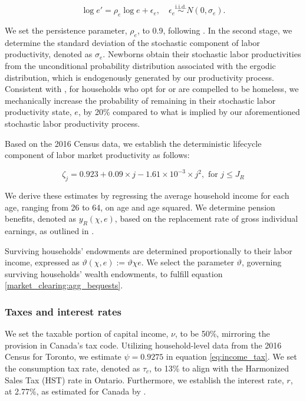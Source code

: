 \documentclass[parskip=full]{article}
\begin{document}
\begin{equation*}
  \log e' = \rho_{e} \log e + \epsilon_{e},\quad \epsilon_{e}\overset{\mathrm{i.i.d.}} \sim N(0,\sigma_{e}).
\end{equation*}

\noindent We set the persistence parameter, $\rho_{e}$, to 0.9, following \citet{gkkoc}. In the second stage, we determine the standard deviation of the stochastic component of labor productivity, denoted as $\sigma_{e}$. Newborns obtain their stochastic labor productivities from the unconditional probability distribution associated with the ergodic distribution, which is endogenously generated by our productivity process. Consistent with \citet{az-2024}, for households who opt for or are compelled to be homeless, we mechanically increase the probability of remaining in their stochastic labor productivity state, $e$, by 20\% compared to what is implied by our aforementioned stochastic labor productivity process.

Based on the 2016 Census data, we establish the deterministic lifecycle component of labor market productivity as follows:

\begin{equation*}
\zeta_j = 0.923+0.09\times j-1.61\times 10^{-3}\times j^{2}, \mbox{ for } j\leq J_{R}
\end{equation*}

\noindent We derive these estimates by regressing the average household income for each age, ranging from 26 to 64, on age and age squared. We determine pension benefits, denoted as ${y_{R}(\chi,e)}$, based on the replacement rate of gross individual earnings, as outlined in \citet{OECD-pension}.

Surviving households' endowments are determined proportionally to their labor income, expressed as $\vartheta(\chi,e):=\vartheta \chi e$. We select the parameter $\vartheta$, governing surviving households' wealth endowments, to fulfill equation \eqref{market_clearing:agg_bequests}.

\subsubsection{Taxes and interest rates}

We set the taxable portion of capital income, $\nu$, to be 50\%, mirroring the provision in Canada's tax code. Utilizing household-level data from the 2016 Census for Toronto, we estimate $\psi=0.9275$ in equation \eqref{eq:income_tax}. We set the consumption tax rate, denoted as $\tau_{c}$, to 13\% to align with the Harmonized Sales Tax (HST) rate in Ontario. Furthermore, we establish the interest rate, $r$, at 2.77\%, as estimated for Canada by \citet{bruneau-etal-2018}.
\end{document}
